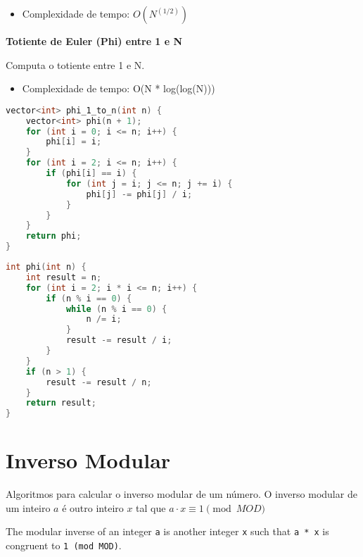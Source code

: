 \documentclass[11pt, a4paper, oneside]{book}
\begin{document}
\begin{itemize}
\item Complexidade de tempo: $O(N^(1/2))$
\end{itemize}



\textbf{Totiente de Euler (Phi) entre 1 e N} 

Computa o totiente entre 1 e N.



\begin{itemize}
\item Complexidade de tempo: O(N * log(log(N)))
\end{itemize}

\hfill

\begin{multicols}{2}
\begin{lstlisting}[language=C++]
vector<int> phi_1_to_n(int n) {
    vector<int> phi(n + 1);
    for (int i = 0; i <= n; i++) {
        phi[i] = i;
    }
    for (int i = 2; i <= n; i++) {
        if (phi[i] == i) {
            for (int j = i; j <= n; j += i) {
                phi[j] -= phi[j] / i;
            }
        }
    }
    return phi;
}
\end{lstlisting}
\end{multicols}

\hfill

\begin{multicols}{2}
\begin{lstlisting}[language=C++]
int phi(int n) {
    int result = n;
    for (int i = 2; i * i <= n; i++) {
        if (n % i == 0) {
            while (n % i == 0) {
                n /= i;
            }
            result -= result / i;
        }
    }
    if (n > 1) {
        result -= result / n;
    }
    return result;
}
\end{lstlisting}
\end{multicols}

\hfill

\section{Inverso Modular}


Algoritmos para calcular o inverso modular de um número. O inverso modular de um inteiro $a$ é outro inteiro $x$ tal que $a \cdot x \equiv 1 \pmod{MOD}$



The modular inverse of an integer \lstinline{a} is another integer \lstinline{x} such that \lstinline{a * x} is congruent to \lstinline{1 (mod MOD)}.
\end{document}
